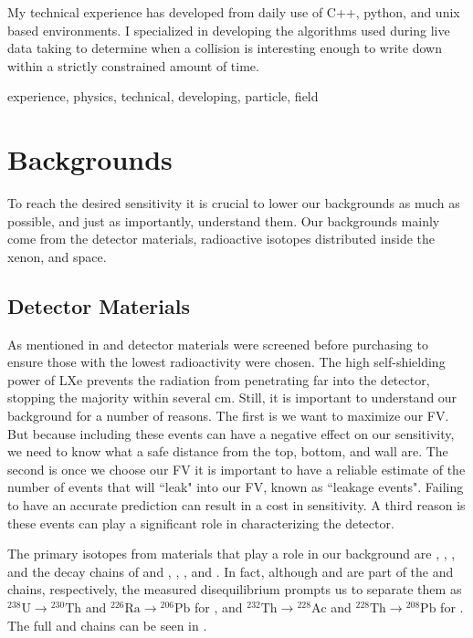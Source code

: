 My technical experience has developed from daily use of C++, python, and unix based environments. I specialized in developing the algorithms used during live data taking to determine when a collision is interesting enough to write down within a strictly constrained amount of time.



experience, physics, technical, developing, particle, field
\section{Backgrounds}
\label{sec:backgrounds}
To reach the desired sensitivity it is crucial to lower our backgrounds as much as possible, and just as importantly, understand
them.  Our backgrounds mainly come from the detector materials, radioactive isotopes distributed inside the xenon, and space.

\subsection{Detector Materials}
\label{subsec:backgrounds_detector_materials}
As mentioned in  and  detector materials were screened before purchasing to ensure
those with the lowest radioactivity were chosen.  The high self-shielding power of LXe prevents the radiation from penetrating far into
the detector, stopping the majority within several cm.  Still, it is important to understand our background for a number of reasons.  The
first is we want to maximize our FV.  But because including these events can have a negative effect on our sensitivity, we need to know
what a safe distance from the top, bottom, and wall are.  The second is once we choose our FV it is important to have a reliable estimate
of the number of events that will ``leak" into our FV, known as ``leakage events".  Failing to have an accurate prediction can result in
a cost in sensitivity.  A third reason is these events can play a significant role in characterizing the detector.

The primary isotopes from materials that play a role in our background are , , , and the decay chains
of and , , , and .  In fact, although  and  are part of the
 and  chains, respectively, the measured disequilibrium prompts us to separate them as
$\mathrm{^{238}U} \rightarrow \mathrm{^{230}Th}$ and $\mathrm{^{226}Ra} \rightarrow \mathrm{^{206}Pb}$ for , and
$\mathrm{^{232}Th} \rightarrow \mathrm{^{228}Ac}$ and $\mathrm{^{228}Th} \rightarrow \mathrm{^{208}Pb}$ for .  The full
 and  chains can be seen in .

